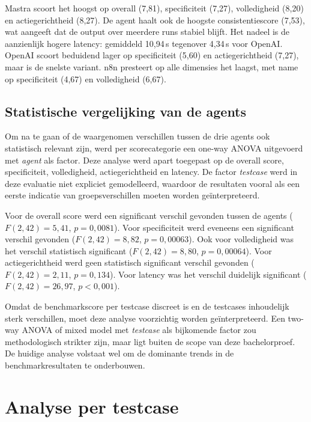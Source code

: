 Mastra scoort het hoogst op overall (7,81), specificiteit (7,27), volledigheid (8,20) en actiegerichtheid (8,27). De agent haalt ook de hoogste consistentiescore (7,53), wat aangeeft dat de output over meerdere runs stabiel blijft. Het nadeel is de aanzienlijk hogere latency: gemiddeld 10,94\,s tegenover 4,34\,s voor OpenAI. OpenAI scoort beduidend lager op specificiteit (5,60) en actiegerichtheid (7,27), maar is de snelste variant. n8n presteert op alle dimensies het laagst, met name op specificiteit (4,67) en volledigheid (6,67).

\subsection{Statistische vergelijking van de agents}
\label{subsec:statistische-vergelijking}

Om na te gaan of de waargenomen verschillen tussen de drie agents ook statistisch relevant zijn, werd per scorecategorie een one-way ANOVA uitgevoerd met \textit{agent} als factor. Deze analyse werd apart toegepast op de overall score, specificiteit, volledigheid, actiegerichtheid en latency. De factor \textit{testcase} werd in deze evaluatie niet expliciet gemodelleerd, waardoor de resultaten vooral als een eerste indicatie van groepsverschillen moeten worden geïnterpreteerd.

Voor de overall score werd een significant verschil gevonden tussen de agents (\(F(2,42)=5{,}41\), \(p=0{,}0081\)). Voor specificiteit werd eveneens een significant verschil gevonden (\(F(2,42)=8{,}82\), \(p=0{,}00063\)). Ook voor volledigheid was het verschil statistisch significant (\(F(2,42)=8{,}80\), \(p=0{,}00064\)). Voor actiegerichtheid werd geen statistisch significant verschil gevonden (\(F(2,42)=2{,}11\), \(p=0{,}134\)). Voor latency was het verschil duidelijk significant (\(F(2,42)=26{,}97\), \(p<0{,}001\)).

Omdat de benchmarkscore per testcase discreet is en de testcases inhoudelijk sterk verschillen, moet deze analyse voorzichtig worden geïnterpreteerd. Een two-way ANOVA of mixed model met \textit{testcase} als bijkomende factor zou methodologisch strikter zijn, maar ligt buiten de scope van deze bachelorproef. De huidige analyse volstaat wel om de dominante trends in de benchmarkresultaten te onderbouwen.

\section{Analyse per testcase}
\label{sec:analyse-per-testcase}

